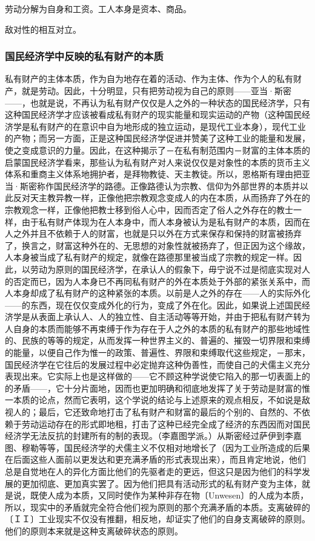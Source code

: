 \documentclass[a4paper,twoside,12pt,AutoFakeBold]{ctexart}
\begin{document}
劳动分解为自身和工资。工人本身是资本、商品。

敌对性的相互对立。

\subsubsection{国民经济学中反映的私有财产的本质}
私有财产的主体本质，作为自为地存在着的活动、作为主体、作为个人的私有财产，就是劳动。因此，十分明显，只有把劳动视为自己的原则——亚当·斯密——，也就是说，不再认为私有财产仅仅是人之外的一种状态的国民经济学，只有这种国民经济学才应该被看成私有财产的现实能量和现实运动的产物（这种国民经济学是私有财产的在意识中自为地形成的独立运动，是现代工业本身），现代工业的产物；而另一方面，正是这种国民经济学促进并赞美了这种工业的能量和发展，使之变成意识的力量。因此，在这种揭示了－在私有制范围内－财富的主体本质的启蒙国民经济学看来，那些认为私有财产对人来说仅仅是对象性的本质的货币主义体系和重商主义体系地拥护者，是拜物教徒、天主教徒。所以，恩格斯有理由把亚当·斯密称作国民经济学的路德。正像路德认为宗教、信仰为外部世界的本质并以此反对天主教异教一样，正像他把宗教观念变成人的内在本质，从而扬弃了外在的宗教观念一样，正像他把教士移到俗人心中，因而否定了俗人之外存在的教士一样，由于私有财产体现为在人本身中，而人本身被认为是私有财产的本质，因而在人之外并且不依赖于人的财富，也就是只以外在方式来保存和保持的财富被扬弃了，换言之，财富这种外在的、无思想的对象性就被扬弃了，但正因为这个缘故，人本身被当成了私有财产的规定，就像在路德那里被当成了宗教的规定一样。因此，以劳动为原则的国民经济学，在承认人的假象下，毋宁说不过是彻底实现对人的否定而已，因为人本身已不再同私有财产的外在本质处于外部的紧张关系中，而人本身却成了私有财产的这种紧张的本质。以前是人之外的存在——人的实际外化——的东西，现在仅仅变成外化的行为，变成了外在化。因此，如果说上述国民经济学是从表面上承认人、人的独立性、自主活动等等开始，并由于把私有财产转为人自身的本质而能够不再束缚于作为存在于人之外的本质的私有财产的那些地域性的、民族的等等的规定，从而发挥一种世界主义的、普遍的、摧毁一切界限和束缚的能量，以便自己作为惟一的政策、普遍性、界限和束缚取代这些规定，－那末，国民经济学在它往后的发展过程中必定抛弃这种伪善性，而使自己的犬儒主义充分表现出来。它实际上也是这样做的——它不顾这种学说使它陷入的那一切表面上的的矛盾——，它十分片面地，因而也更加明确和彻底地发挥了关于劳动是财富的惟一本质的论点，然而它表明，这个学说的结论与上述原来的观点相反，不如说是敌视人的；最后，它还致命地打击了私有财产和财富的最后的个别的、自然的、不依赖于劳动运动存在的形式即地租，打击了这种已经完全成了经济的东西因而对国民经济学无法反抗的封建所有的制的表现。（李嘉图学派。）从斯密经过萨伊到李嘉图、穆勒等等，国民经济学的犬儒主义不仅相对地增长了（因为工业所造成的后果在后面这些人面前以更发达和更充满矛盾的形式表现出来），而且肯定地说，他们总是自觉地在人的异化方面比他们的先驱者走的更远，但这只是因为他们的科学发展的更加彻底、更加真实罢了。因为他们把具有活动形式的私有财产变为主体，就是说，既使人成为本质，又同时使作为某种非存在物〔Unwesen〕的人成为本质，所以，现实中的矛盾就完全符合他们视为原则的那个充满矛盾的本质。支离破碎的〔ＩＩ〕工业现实不仅没有推翻，相反地，却证实了他们的自身支离破碎的原则。他们的原则本来就是这种支离破碎状态的原则。
\end{document}
